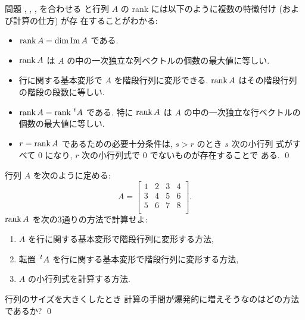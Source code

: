 \documentclass[12pt,twoside]{jarticle}
\begin{document}

{\large
\begin{summary}
  問題 , 
  , ,  を合わせる
  と行列 $A$ の rank には以下のように複数の特徴付け (および計算の仕方) が存
  在することがわかる:
  \begin{itemize}
  \item $\mathop{\mathrm{rank}}\nolimits A = \dim\mathop{\mathrm{Im}}\nolimits A$ である.
  \item $\mathop{\mathrm{rank}}\nolimits A$ は $A$ の中の一次独立な列ベクトルの個数の最大値に等しい.
  \item 行に関する基本変形で $A$ を階段行列に変形できる. 
    $\mathop{\mathrm{rank}}\nolimits A$ はその階段行列の階段の段数に等しい.
  \item $\rank A = \rank\tp{A}$ である.
    特に $\mathop{\mathrm{rank}}\nolimits A$ は $A$ の中の一次独立な行ベクトルの個数の最大値に等しい.
  \item $r=\mathop{\mathrm{rank}}\nolimits A$ であるための必要十分条件は, $s>r$ のとき $s$ 次の小行列
    式がすべて $0$ になり, $r$ 次の小行列式で $0$ でないものが存在することで
    ある. \qed
  \end{itemize}
\end{summary}
}


\begin{question}
  \label{q:rank-3}
  行列 $A$ を次のように定める:
  \begin{equation*}
    A =
    \begin{bmatrix}
      1 & 2 & 3 & 4 \\
      3 & 4 & 5 & 6 \\
      5 & 6 & 7 & 8 \\
    \end{bmatrix}.
  \end{equation*}
  $\mathop{\mathrm{rank}}\nolimits A$ を次の3通りの方法で計算せよ:
  \begin{enumerate}
  \item $A$ を行に関する基本変形で階段行列に変形する方法, 
  \item 転置 $\tp{A}$ を行に関する基本変形で階段行列に変形する方法, 
  \item $A$ の小行列式を計算する方法.
  \end{enumerate}
  行列のサイズを大きくしたとき
  計算の手間が爆発的に増えそうなのはどの方法であるか?
  \qed
\end{question}
\end{document}
